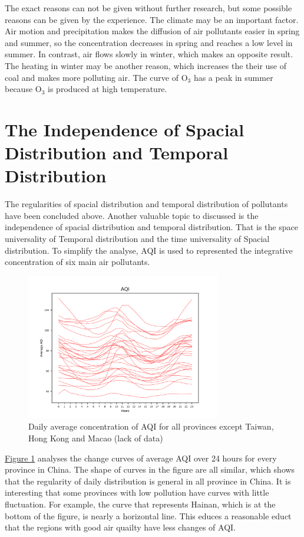 \documentclass[letterpaper]{article}
\begin{document}
\begin{CJK*}{UTF8}{gkai}
The exact reasons can not be given without further research, but some possible reasons can be given by the experience. The climate may be an important factor. Air motion and precipitation makes the diffusion of air pollutants easier in spring and summer, so the concentration decreases in spring and reaches a low level in summer. In contrast, air flows slowly in winter, which makes an opposite result. The heating in winter may be another reason, which increases the their use of coal and makes more polluting air. The curve of O$_{3}$ has a peak in summer because O$_{3}$ is produced at high temperature.

\section{The Independence of Spacial Distribution and Temporal Distribution}

The regularities of spacial distribution and temporal distribution of pollutants have been concluded above. Another valuable topic to discussed is the independence of spacial distribution and temporal distribution. That is the space universality of Temporal distribution and the time universality of Spacial distribution. To simplify the analyse, AQI is used to represented the integrative concentration of six main air pollutants.

\begin{figure}[h]
  \includegraphics[width = 8.5cm]{dailyavg_pro_pltn.png}
  \caption{Daily average concentration of AQI for all provinces except Taiwan, Hong Kong and Macao (lack of data)}
  \label{figure:5}
\end{figure}

\hyperref[figure:5]{Figure \ref*{figure:5}} analyses the change curves of average AQI over 24 hours for every province in China. The shape of curves in the figure are all similar, which shows that the regularity of daily distribution is general in all province in China. It is interesting that some provinces with low pollution have curves with little fluctuation. For example, the curve that represents Hainan, which is at the bottom of the figure, is nearly a horizontal line. This educes a reasonable educt that the regions with good air quailty have less changes of AQI.


\end{CJK*}
\end{document}
